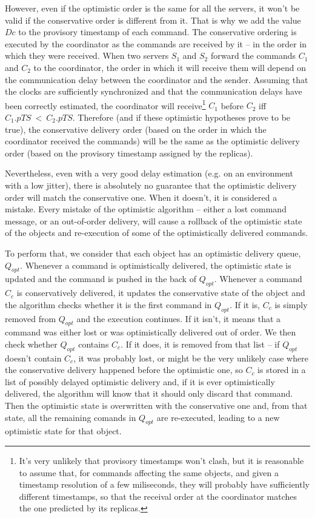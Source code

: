 \documentclass[times, 10pt]{article}
\begin{document}
However, even if the optimistic order is the same for all the servers, it won't be valid if the conservative order is different from it. That is why we add the value $Dc$ to the provisory timestamp of each command. The conservative ordering is executed by the coordinator as the commands are received by it -- in the order in which they were received. When two servers $S_1$ and $S_2$ forward the commands $C_1$ and $C_2$ to the coordinator, the order in which it will receive them will depend on the communication delay between the coordinator and the sender. Assuming that the clocks are sufficiently synchronized and that the communication delays have been correctly estimated, the coordinator will receive\footnote{It's very unlikely that provisory timestamps won't clash, but it is reasonable to assume that, for commands affecting the same objects, and given a timestamp resolution of a few miliseconds, they will probably have sufficiently different timestamps, so that the receival order at the coordinator matches the one predicted by its replicas.} $C_1$ before $C_2$ iff $C_1.pTS~<~C_2.pTS$. Therefore (and if these optimistic hypotheses prove to be true), the conservative delivery order (based on the order in which the coordinator received the commands) will be the same as the optimistic delivery order (based on the provisory timestamp assigned by the replicas).

Nevertheless, even with a very good delay estimation (e.g. on an environment with a low jitter), there is absolutely no guarantee that the optimistic delivery order will match the conservative one. When it doesn't, it is considered a mistake. Every mistake of the optimistic algorithm -- either a lost command message, or an out-of-order delivery, will cause a rollback of the optimistic state of the objects and re-execution of some of the optimistically delivered commands.

To perform that, we consider that each object has an optimistic delivery queue, $Q_{opt}$. Whenever a command is optimistically delivered, the optimistic state is updated and the command is pushed in the back of $Q_{opt}$. Whenever a command $C_c$ is conservatively delivered, it updates the conservative state of the object and the algorithm checks whether it is the first command in $Q_{opt}$. If it is, $C_c$ is simply removed from $Q_{opt}$ and the execution continues. If it isn't, it means that a command was either lost or was optimistically delivered out of order. We then check whether $Q_{opt}$ contains $C_c$. If it does, it is removed from that list -- if $Q_{opt}$ doesn't contain $C_c$, it was probably lost, or might be the very unlikely case where the conservative delivery happened before the optimistic one, so $C_c$ is stored in a list of possibly delayed optimistic delivery and, if it is ever optimistically delivered, the algorithm will know that it should only discard that command. Then the optimistic state is overwritten with the conservative one and, from that state, all the remaining comands in $Q_{opt}$ are re-executed, leading to a new optimistic state for that object.


%
%
\end{document}
